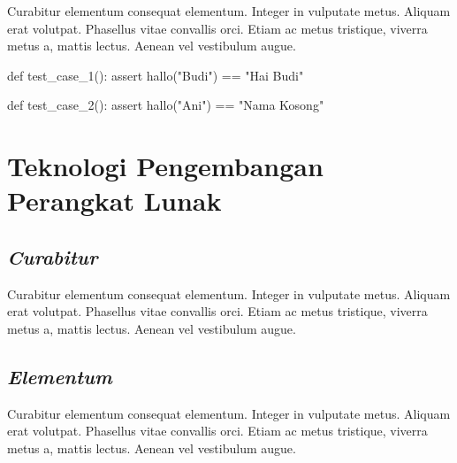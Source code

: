 Curabitur elementum consequat elementum. Integer in vulputate
metus. Aliquam erat volutpat. Phasellus vitae convallis orci. Etiam ac
metus tristique, viverra metus a, mattis lectus. Aenean vel vestibulum
augue.

\newpage

\begin{center}
\begin{minipage}{0.8\textwidth}
\begin{code}
\begin{ignasicblock}[title=test\_hallo,minted language=Python]
      def test_case_1():
          assert hallo("Budi") == "Hai Budi"

      def test_case_2():
          assert hallo("Ani") == "Nama Kosong"
\end{ignasicblock}
\label{ts:hallo}
\end{code}
\end{minipage}
\end{center}


\section{Teknologi Pengembangan Perangkat Lunak}

\subsection{\emph{Curabitur}}

Curabitur elementum consequat elementum. Integer in vulputate
metus. Aliquam erat volutpat. Phasellus vitae convallis orci. Etiam ac
metus tristique, viverra metus a, mattis lectus. Aenean vel vestibulum
augue.

\subsection{\emph{Elementum}}

Curabitur elementum consequat elementum. Integer in vulputate
metus. Aliquam erat volutpat. Phasellus vitae convallis orci. Etiam ac
metus tristique, viverra metus a, mattis lectus. Aenean vel vestibulum
augue.

